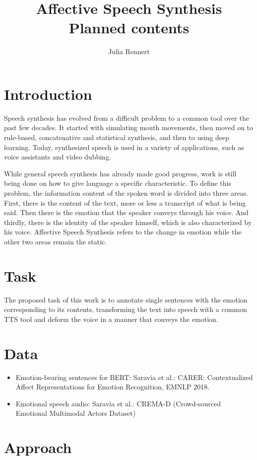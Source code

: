 \documentclass[12pt]{article}
\title{Affective Speech Synthesis \\ \large{Planned contents}}
\author{Julia Rennert}
\begin{document}
\maketitle

\section{Introduction}
Speech synthesis has evolved from a difficult problem to a common tool over the past few decades. It started with simulating mouth movements, then moved on to rule-based, concatenative and statistical synthesis, and then to using deep learning. Today, synthesized speech is used in a variety of applications, such as voice assistants and video dubbing.

While general speech synthesis has already made good progress, work is still being done on how to give language a specific characteristic. To define this problem, the information content of the spoken word is divided into three areas. First, there is the content of the text, more or less a transcript of what is being said. Then there is the emotion that the speaker conveys through his voice. And thirdly, there is the identity of the speaker himself, which is also characterized by his voice. Affective Speech Synthesis refers to the change in emotion while the other two areas remain the static.

\section{Task}
The proposed task of this work is to annotate single sentences with the emotion corresponding to its contents, transforming the text into speech with a common TTS tool and deform the voice in a manner that conveys the emotion.

\section{Data}
\begin{itemize}
\item Emotion-bearing sentences for BERT: Saravia et al.: CARER: Contextualized Affect Representations for Emotion Recognition, EMNLP 2018. 
\item Emotional speech audio: Saravia et al.: CREMA-D (Crowd-sourced Emotional Multimodal Actors Dataset)
\end{itemize}
\section{Approach}
\end{document}
